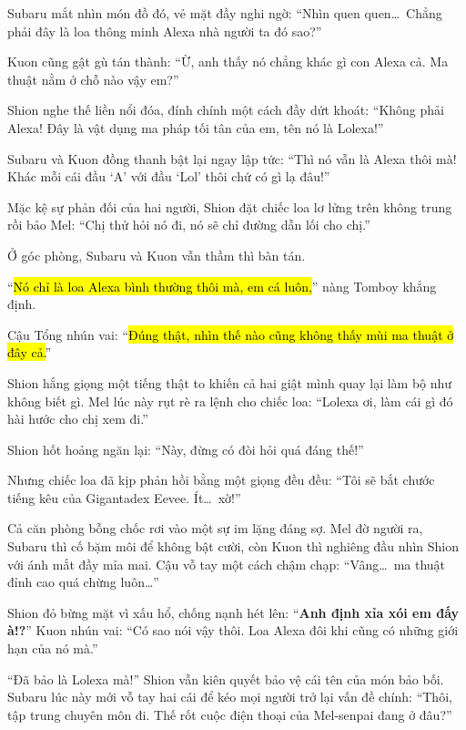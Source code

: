 \documentclass[../main.tex]{subfiles}
\begin{document}

Subaru mắt nhìn món đồ đó, vẻ mặt đầy nghi ngờ: ``Nhìn quen quen\dots\ Chẳng phải đây là loa thông minh Alexa nhà người ta đó sao?''

Kuon cũng gật gù tán thành: ``Ừ, anh thấy nó chẳng khác gì con Alexa cả. Ma thuật nằm ở chỗ nào vậy em?''

Shion nghe thế liền nổi đóa, đính chính một cách đầy dứt khoát: ``Không phải Alexa! Đây là vật dụng ma pháp tối tân của em, tên nó là Lolexa!''

Subaru và Kuon đồng thanh bật lại ngay lập tức: ``Thì nó vẫn là Alexa thôi mà! Khác mỗi cái đầu `A' với đầu `Lol' thôi chứ có gì lạ đâu!''

Mặc kệ sự phản đối của hai người, Shion đặt chiếc loa lơ lửng trên không trung rồi bảo Mel: ``Chị thử hỏi nó đi, nó sẽ chỉ đường dẫn lối cho chị.''

Ở góc phòng, Subaru và Kuon vẫn thầm thì bàn tán.

``\hl{Nó chỉ là loa Alexa bình thường thôi mà, em cá luôn,}'' nàng Tomboy khẳng định.

Cậu Tổng nhún vai: ``\hl{Đúng thật, nhìn thế nào cũng không thấy mùi ma thuật ở đây cả.}''

Shion hắng giọng một tiếng thật to khiến cả hai giật mình quay lại làm bộ như không biết gì. Mel lúc này rụt rè ra lệnh cho chiếc loa: ``Lolexa ơi, làm cái gì đó hài hước cho chị xem đi.''

Shion hốt hoảng ngăn lại: ``Này, đừng có đòi hỏi quá đáng thế!''

Nhưng chiếc loa đã kịp phản hồi bằng một giọng đều đều: ``Tôi sẽ bắt chước tiếng kêu của Gigantadex Eevee. Ít\dots\ xờ!''


Cả căn phòng bỗng chốc rơi vào một sự im lặng đáng sợ. Mel đờ người ra, Subaru thì cố bặm môi để không bật cười, còn Kuon thì nghiêng đầu nhìn Shion với ánh mắt đầy mỉa mai. Cậu vỗ tay một cách chậm chạp: ``Vâng\dots\ ma thuật đỉnh cao quá chừng luôn\dots''

Shion đỏ bừng mặt vì xấu hổ, chống nạnh hét lên: ``\textbf{Anh định xỉa xói em đấy à!?}''
Kuon nhún vai: ``Có sao nói vậy thôi. Loa Alexa đôi khi cũng có những giới hạn của nó mà.''

``Đã bảo là Lolexa mà!'' Shion vẫn kiên quyết bảo vệ cái tên của món bảo bối. Subaru lúc này mới vỗ tay hai cái để kéo mọi người trở lại vấn đề chính: ``Thôi, tập trung chuyên môn đi. Thế rốt cuộc điện thoại của Mel-senpai đang ở đâu?''
\end{document}
